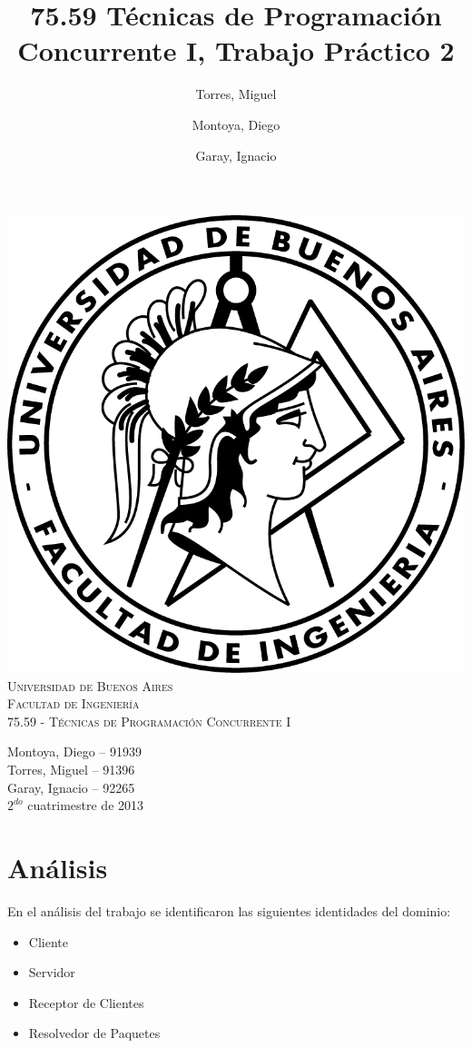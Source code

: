 \documentclass[a4paper,12pt,titlepage]{article}
\title{75.59 Técnicas de Programación Concurrente I, Trabajo Práctico 2}
\author{Torres, Miguel \and Montoya, Diego \and Garay, Ignacio}
\begin{document}
\thispagestyle{empty}
\begin{center}
\includegraphics{./logo-fiuba.png}\\
\vspace{1cm}
\textsc{\LARGE Universidad de Buenos Aires}\\[0.3cm]
\textsc{\LARGE Facultad de Ingenier\'ia}\\[1.2cm]
\textsc{\Large 75.59 - Técnicas de Programación Concurrente I}\\[0.3cm]
\end{center}

\begin{flushright}
{\large
Montoya, Diego -- 91939\\
Torres, Miguel -- 91396\\
Garay, Ignacio -- 92265\\
\vspace{2cm}
$2^{do}$ cuatrimestre de 2013}
\end{flushright}

\pagestyle{fancy}
\setcounter{page}{1}
\newpage

\tableofcontents
\newpage

\footnotesize
\section{Análisis}
En el análisis del trabajo se identificaron las siguientes identidades del dominio:\\
\begin{itemize}
\item Cliente
\item Servidor
\item Receptor de Clientes
\item Resolvedor de Paquetes\\
\end{itemize} 
\end{document}

